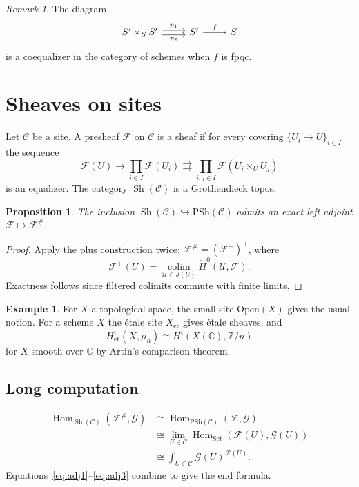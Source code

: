 \documentclass[11pt]{amsart}
\newtheorem{proposition}[theorem]{Proposition}
\theoremstyle{definition}
\newtheorem{example}[theorem]{Example}
\theoremstyle{remark}
\newtheorem{remark}[theorem]{Remark}
\newcommand{\Hom}{\operatorname{Hom}}
\newcommand{\cC}{\mathcal{C}}
\newcommand{\cF}{\mathcal{F}}
\newcommand{\Sh}{\operatorname{Sh}}
\begin{document}
\begin{remark}
The diagram
\[
\begin{tikzcd}
S'\times_S S' \arrow[r, shift left, "p_1"] \arrow[r, shift right, "p_2"'] & S' \arrow[r, "f"] & S
\end{tikzcd}
\]
is a coequalizer in the category of schemes when $f$ is fpqc.
\end{remark}

\section{Sheaves on sites}\label{sec:sites}
Let $\cC$ be a site. A presheaf $\cF$ on $\cC$ is a sheaf if for every
covering $\{U_i\to U\}_{i\in I}$ the sequence
\[
\cF(U)\to\prod_{i\in I}\cF(U_i)\rightrightarrows\prod_{i,j\in I}\cF(U_i\times_U U_j)
\]
is an equalizer. The category $\Sh(\cC)$ is a Grothendieck topos.

\begin{proposition}\label{prop:sheafification}
The inclusion $\Sh(\cC)\hookrightarrow\mathrm{PSh}(\cC)$ admits an exact left
adjoint $\cF\mapsto\cF^{\#}$.
\end{proposition}

\begin{proof}
Apply the plus construction twice: $\cF^{\#}=(\cF^+)^+$, where
\[
\cF^+(U)=\operatorname*{colim}_{\mathcal{U}\in J(U)}\check{H}^0(\mathcal{U},\cF).
\]
Exactness follows since filtered colimits commute with finite limits.
\end{proof}

\begin{example}
For $X$ a topological space, the small site $\mathrm{Open}(X)$ gives the
usual notion. For a scheme $X$ the étale site $X_{\text{ét}}$ gives
étale sheaves, and
\[
H^i_{\text{ét}}(X,\mu_n)\cong H^i(X(\mathbb{C}),\mathbb{Z}/n)
\]
for $X$ smooth over $\mathbb{C}$ by Artin's comparison theorem.
\end{example}

\subsection{Long computation}
\begin{align}
\Hom_{\Sh(\cC)}(\cF^{\#},\mathcal{G})
&\cong \Hom_{\mathrm{PSh}(\cC)}(\cF,\mathcal{G}) \label{eq:adj1}\\
&\cong \lim_{U\in\cC}\Hom_{\mathrm{Set}}(\cF(U),\mathcal{G}(U)) \label{eq:adj2}\\
&\cong \int_{U\in\cC}\mathcal{G}(U)^{\cF(U)}. \label{eq:adj3}
\end{align}
Equations~\eqref{eq:adj1}--\eqref{eq:adj3} combine to give the end formula.
\end{document}
